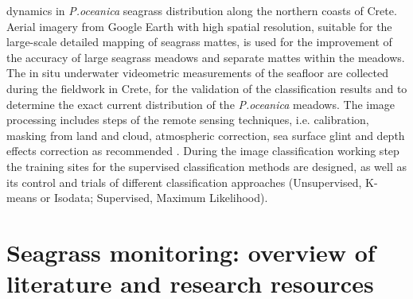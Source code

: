 \documentclass[10pt, a4paper]{article}
\begin{document}
dynamics in \textit{P.oceanica} seagrass distribution along the northern coasts of Crete. Aerial imagery from
Google Earth with high spatial resolution, suitable for the large-scale detailed mapping of seagrass
mattes, is used for the improvement of the accuracy of large seagrass meadows and separate mattes
within the meadows. The in situ underwater videometric measurements of the seafloor are collected
during the fieldwork in Crete, for the validation of the classification results and to determine the exact
current distribution of the \textit{P.oceanica} meadows. The image processing includes steps of the remote
sensing techniques, i.e. calibration, masking from land and cloud, atmospheric correction, sea surface
glint and depth effects correction as recommended \cite{Matarrese08}\label{Matarrese08}. During the image classification
working step the training sites for the supervised classification methods are designed, as well as its
control and trials of different classification approaches (Unsupervised, K-means or Isodata;
Supervised, Maximum Likelihood).
\pagebreak

\section[Overview of literature]{Seagrass monitoring: overview of literature and research resources} \label{sec:2}
\end{document}
